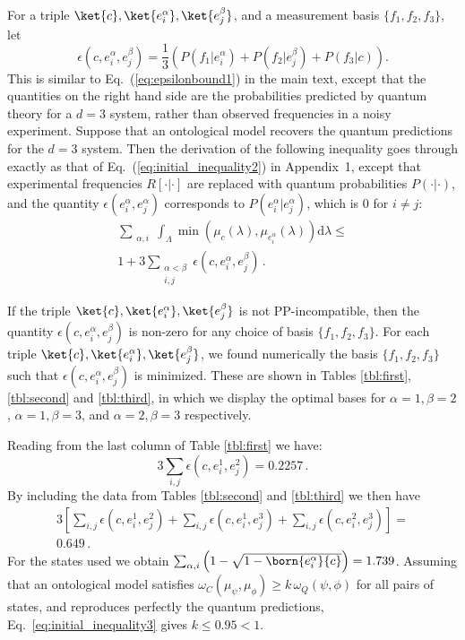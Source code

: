 For a triple $\ket{c},\ket{e^\alpha_i},\ket{e^\beta_j}$, and a measurement basis $\{f_1,f_2,f_3\}$, let
\[
\epsilon(c,e^\alpha_i,e^\beta_j) = \frac13 \left( P(f_1|e^\alpha_i) + P(f_2|e^\beta_j) + P(f_3|c) \right).
\]
This is similar to Eq.~(\ref{eq:epsilonbound1}) in the main text, except that the quantities on the right hand side are the probabilities predicted by quantum theory for a $d=3$ system, rather than observed frequencies in a noisy experiment. Suppose that an ontological model recovers the quantum predictions for the $d=3$ system. Then the derivation of the following inequality goes through exactly as that of Eq.~(\ref{eq:initial_inequality2}) in Appendix~1, except that experimental frequencies $R[\cdot | \cdot]$ are replaced with quantum probabilities $P( \cdot | \cdot )$, and the quantity $\epsilon(e^\alpha_i,e^\alpha_j)$ corresponds to $P(e^\alpha_i | e^\alpha_j)$, which is $0$ for $i\ne j$:
\begin{multline}
\label{eq:initial_inequality3}
\sum_{\substack{\alpha,i}}  \int_\Lambda \min \left(\mu_c(\lambda),\mu_{e^\alpha_i}(\lambda) \right)\mathrm{d}\lambda \le \\ 
1+   3 \sum_{\substack{\alpha<\beta \\ i,j}} \epsilon(c, e^\alpha_i,e^\beta_j) \,.
\end{multline}

If the triple $\ket{c},\ket{e^\alpha_i},\ket{e^\beta_j}$ is not PP-incompatible, then the quantity $\epsilon(c,e^\alpha_i,e^\beta_j)$ is non-zero for any choice of basis $\{f_1,f_2,f_3\}$. For each triple $\ket{c},\ket{e^\alpha_i},\ket{e^\beta_j}$, we found numerically the basis $\{f_1,f_2,f_3\}$ such that $\epsilon(c,e^\alpha_i,e^\beta_j)$ is minimized. These are shown in Tables \ref{tbl:first}, \ref{tbl:second} and \ref{tbl:third}, in which we display the optimal bases for $\alpha=1,\beta=2$, $\alpha=1,\beta=3$, and $\alpha=2,\beta=3$ respectively.

Reading from the last column of Table \ref{tbl:first} we have:
\[
3 \sum_{i,j}\epsilon(c,e^1_i,e^2_j)=0.2257\,.
\]
By including the data from Tables \ref{tbl:second} and \ref{tbl:third} we then have
\begin{multline}
3 \left[ \sum_{i,j}\epsilon(c,e^1_i,e^2_j)+ \sum_{i,j}\epsilon(c,e^1_i,e^3_j)+ \sum_{i,j}\epsilon(c,e^2_i,e^3_j) \right]= \\
0.649\,.
\end{multline}
For the states used we obtain $ \sum_{\alpha,i}\left(1-\sqrt{1-\born{e^\alpha_i}{c}}\right)=1.739$. Assuming that an ontological model satisfies $\omega_C(\mu_\psi,\mu_\phi) \geq k \,\omega_Q(\psi,\phi)$ for all pairs of states, and reproduces perfectly the quantum predictions, Eq.~\eqref{eq:initial_inequality3} gives $k\leq0.95<1$.

